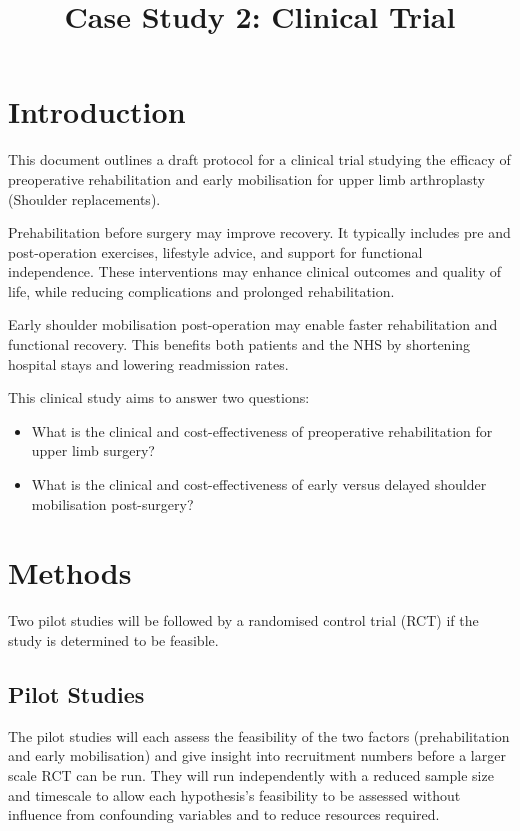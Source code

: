 \documentclass[conference]{IEEEtran}
\title{Case Study 2: Clinical Trial}
\date{}
\begin{document}
\justifying

\maketitle

\section{Introduction} 
This document outlines a draft protocol for a clinical trial studying the efficacy of preoperative rehabilitation and early mobilisation for upper limb arthroplasty (Shoulder replacements).

Prehabilitation before surgery may improve recovery. It typically includes pre and post-operation exercises, lifestyle advice, and support for functional independence. These interventions may enhance clinical outcomes and quality of life, while reducing complications and prolonged rehabilitation. 

Early shoulder mobilisation post-operation may enable faster rehabilitation and functional recovery. This benefits both patients and the NHS by shortening hospital stays and lowering readmission rates.

\vspace{4pt}
This clinical study aims to answer two questions:
\begin{itemize}
    \item What is the clinical and cost-effectiveness of preoperative rehabilitation for upper limb surgery?
    \item What is the clinical and cost-effectiveness of early versus delayed shoulder mobilisation post-surgery?
\end{itemize}

\section{Methods}

Two pilot studies will be followed by a randomised control trial (RCT) if the study is determined to be feasible.

\subsection{Pilot Studies}
The pilot studies will each assess the feasibility of the two factors (prehabilitation and early mobilisation) and give insight into recruitment numbers before a larger scale RCT can be run. They will run independently with a reduced sample size and timescale to allow each hypothesis's feasibility to be assessed without influence from confounding variables and to reduce resources required.
\end{document}
